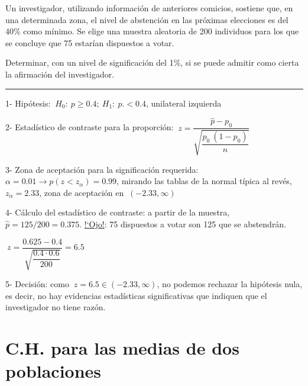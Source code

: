 \vspace{4mm}
\begin{ejemplo}
\begin{ejre}
	Un investigador, utilizando información de anteriores comicios, sostiene que, en una determinada zona, el nivel de abstención en las próximas elecciones es del 40\% como mínimo. Se elige una muestra aleatoria de 200 individuos para los que se concluye que 75 estarían dispuestos a votar.

Determinar, con un nivel de significación del 1\%, si se puede admitir como cierta la afirmación del investigador.

\rule{150pt}{0.1pt}

\vspace{2mm} 1- Hipótesis: $\ H_0:\ p\ge 0.4;\ H_1:\ p. < 0.4$, unilateral izquierda

\vspace{2mm} 2- Estadístico de contraste para la proporción: $\ z = \dfrac{\widehat p - p_0}{\sqrt{ \dfrac{p_0\ (1-p_0)}{n} }}$

\vspace{2mm} 3- Zona de aceptación para la significación requerida: $\alpha=0.01 \to p(z<z_\alpha)=0.99$, mirando las tablas de la normal típica al revés, $z_\alpha=2.33$, zona de aceptación en $\ (-2.33,\infty)$

\vspace{2mm} 4- Cálculo del estadístico de contraste: a partir de la muestra, $\widehat p=125/200=0.375$. \underline{!`Ojo!}: 75 dispuestos a votar son 125 que se abstendrán.

\vspace{2mm} $\ z=\dfrac{0.625-0.4}{\sqrt{\dfrac{0.4\cdot 0.6}{200}}}=6.5$

\vspace{2mm} 5- Decisión: como $ \ z=6.5 \in (-2.33,\infty)$,  no podemos rechazar la hipótesis nula, es decir, no hay evidencias estadísticas significativas que indiquen que el investigador no tiene razón.
\end{ejre}	
\end{ejemplo}


\section[Contraste de hipótesis para la diferencia de las medias de dos poblaciones]{C.H. para las medias de dos poblaciones  }	

